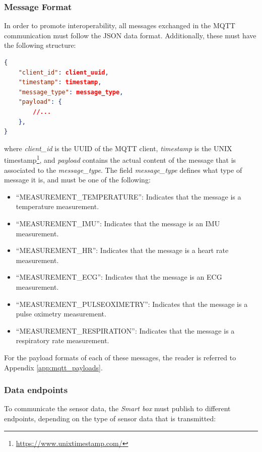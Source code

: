 \subsubsection{Message Format}
\label{sec:mqtt payload format}
In order to promote interoperability, all messages exchanged in the \acs{MQTT} communication must follow the \acs{JSON} data format. Additionally, these must have the following structure:

\begin{lstlisting}[language=json]
{
    "client_id": client_uuid, 
    "timestamp": timestamp,
    "message_type": message_type,
    "payload": {
        //...
    }, 
}  
\end{lstlisting}

where \textit{client\_id} is the \acs{UUID} of the \acs{MQTT} client, \textit{timestamp} is the UNIX timestamp\footnote{\url{https://www.unixtimestamp.com/}}, and \textit{payload} contains the actual content of the message that is associated to the \textit{message\_type}. The field \textit{message\_type} defines what type of message it is, and must be one of the following:

\begin{itemize}
    \item ``MEASUREMENT\_TEMPERATURE'': Indicates that the message is a temperature measurement.
    \item ``MEASUREMENT\_IMU'': Indicates that the message is an \acs{IMU} measurement.
    \item ``MEASUREMENT\_HR'': Indicates that the message is a heart rate measurement.
    \item ``MEASUREMENT\_ECG'': Indicates that the message is an \acs{ECG} measurement.
    \item ``MEASUREMENT\_PULSEOXIMETRY'': Indicates that the message is a pulse oximetry measurement.
    \item ``MEASUREMENT\_RESPIRATION'': Indicates that the message is a respiratory rate measurement.
\end{itemize}

For the payload formats of each of these messages, the reader is referred to Appendix \ref{app:mqtt_payloads}.

\subsubsection{Data endpoints}
To communicate the sensor data, the \textit{Smart box} must publish to different endpoints, depending on the type of sensor data that is transmitted:


